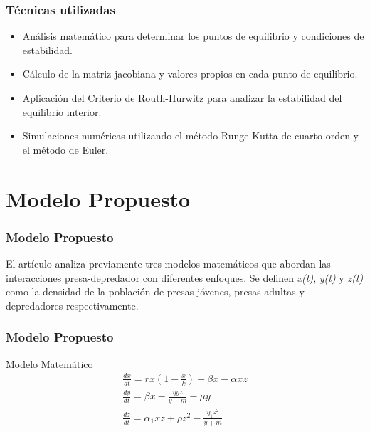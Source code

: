 \documentclass{beamer}
\begin{document}
\begin{frame}
	\frametitle{T\'ecnicas utilizadas}
	\begin{minipage}{10cm}
		\begin{itemize}
			\item Análisis matemático para determinar los puntos de equilibrio y condiciones de estabilidad.
			\item Cálculo de la matriz jacobiana y valores propios en cada punto de equilibrio.
			\item Aplicación del Criterio de Routh-Hurwitz
			      para analizar la estabilidad del equilibrio interior.
			\item Simulaciones numéricas utilizando el método Runge-Kutta de
			      cuarto orden y el método de Euler.
		\end{itemize}
	\end{minipage}
\end{frame}

\section{Modelo Propuesto}
\begin{frame}
	\frametitle{Modelo Propuesto}
	\begin{minipage}{10cm}
		El artículo analiza previamente tres modelos matemáticos que abordan las interacciones presa-depredador con diferentes enfoques.
		Se definen \emph{x(t)}, \emph{y(t)} y \emph{z(t)} como la densidad de la poblaci\'on de presas j\'ovenes, presas adultas y depredadores respectivamente.

	\end{minipage}
\end{frame}

\begin{frame}
	\frametitle{Modelo Propuesto}
	\begin{minipage}{10cm}
		\begin{block}{Modelo Matem\'atico}
			\begin{equation} \label{twoPreyonePredatorEDO}
				\begin{gathered}
					\frac{d x}{d t}=r x\left(1-\frac{x}{k}\right)-\beta x-\alpha x z \\
					\frac{d y}{d t}=\beta x-\frac{\eta y z}{y+m}-\mu y \\
					\frac{d z}{d t}=\alpha_1 x z + \rho z^2-\frac{\eta_1 z^2}{y+m}
				\end{gathered}
			\end{equation}
		\end{block}

	\end{minipage}
\end{frame}
\end{document}
